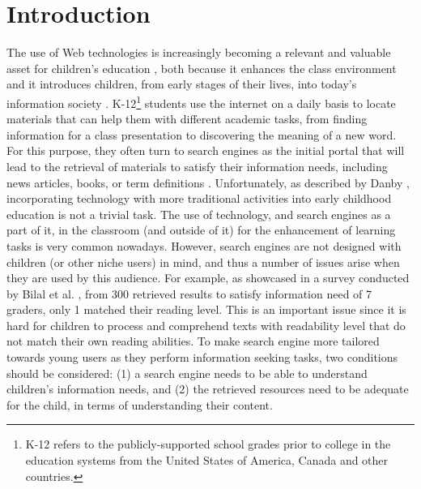 \documentclass{sig-alternate-05-2015}
\begin{document}


%
%

%
%
\printccsdesc



\section{Introduction}
The use of Web technologies is increasingly becoming a relevant and valuable asset for children's education \cite{Kni14}, both because it enhances the class environment and it introduces children, from early stages of their lives, into today's information society \cite{Sad12}. K-12\footnote{ K-12 refers to the publicly-supported school grades prior to college in the education systems from the United States of America, Canada and other countries.}  students use the internet on a daily basis to locate materials that can help them with different academic tasks, from finding information for a class presentation to discovering the meaning of a new word. For this purpose, they often turn to search engines as the initial portal that will lead to the retrieval of materials to satisfy their information needs, including news articles, books, or term definitions \cite{Kni14}. Unfortunately, as described by Danby \cite{Dan13}, incorporating technology with more traditional activities into early childhood education is not a trivial task. The use of technology, and search engines as a part of it, in the classroom (and outside of it) for the enhancement of learning tasks is very common nowadays. However, search engines are not designed with children (or other niche users) in mind, and thus a number of issues arise when they are used by this audience. For example, as showcased in a survey conducted by Bilal et al. \cite{Bil13}, from 300 retrieved results to satisfy information need of 7 graders, only 1 matched their reading level. This is an important issue since it is hard for children to process and comprehend texts with readability level that do not match their own reading abilities. To make search engine more tailored towards young users as they perform information seeking tasks, two conditions should be considered: (1) a search engine needs to be able to understand children's information needs, and (2) the retrieved resources need to be adequate for the child, in terms of understanding their content.
\end{document}
